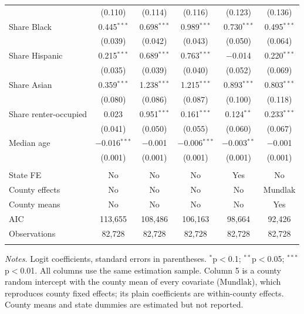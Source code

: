 \begin{table}[!htbp]
\begin{tabular}{@{}lccccc@{}}
  & (0.110) & (0.114) & (0.116) & (0.123) & (0.136) \\ 
  Share Black & 0.445$^{***}$ & 0.698$^{***}$ & 0.989$^{***}$ & 0.730$^{***}$ & 0.495$^{***}$ \\ 
  & (0.039) & (0.042) & (0.043) & (0.050) & (0.064) \\ 
  Share Hispanic & 0.215$^{***}$ & 0.689$^{***}$ & 0.763$^{***}$ & $-$0.014 & 0.220$^{***}$ \\ 
  & (0.035) & (0.039) & (0.040) & (0.052) & (0.069) \\ 
  Share Asian & 0.359$^{***}$ & 1.238$^{***}$ & 1.215$^{***}$ & 0.893$^{***}$ & 0.803$^{***}$ \\ 
  & (0.080) & (0.086) & (0.087) & (0.100) & (0.118) \\ 
  Share renter-occupied & 0.023 & 0.951$^{***}$ & 0.161$^{***}$ & 0.124$^{**}$ & 0.233$^{***}$ \\ 
  & (0.041) & (0.050) & (0.055) & (0.060) & (0.067) \\ 
  Median age & $-$0.016$^{***}$ & $-$0.001 & $-$0.006$^{***}$ & $-$0.003$^{**}$ & $-$0.001 \\ 
  & (0.001) & (0.001) & (0.001) & (0.001) & (0.001) \\ 
 \hline \\[-1.8ex] 
State FE & No & No & No & Yes & No \\ 
County effects & No & No & No & No & Mundlak \\ 
County means & No & No & No & No & Yes \\ 
AIC & 113,655 & 108,486 & 106,163 & 98,664 & 92,426 \\ 
Observations & 82,728 & 82,728 & 82,728 & 82,728 & 82,728 \\ 
\hline 
\hline \\[-1.8ex] 
\end{tabular} 
\vspace{0.6em}
\begin{minipage}{\textwidth}\footnotesize
\textit{Notes.} Logit coefficients, standard errors in parentheses. $^{*}$p$<$0.1; $^{**}$p$<$0.05; $^{***}$p$<$0.01. All columns use the same estimation sample. Column 5 is a county random intercept with the county mean of every covariate (Mundlak), which reproduces county fixed effects; its plain coefficients are within-county effects. County means and state dummies are estimated but not reported.
\end{minipage}
\end{table} 
